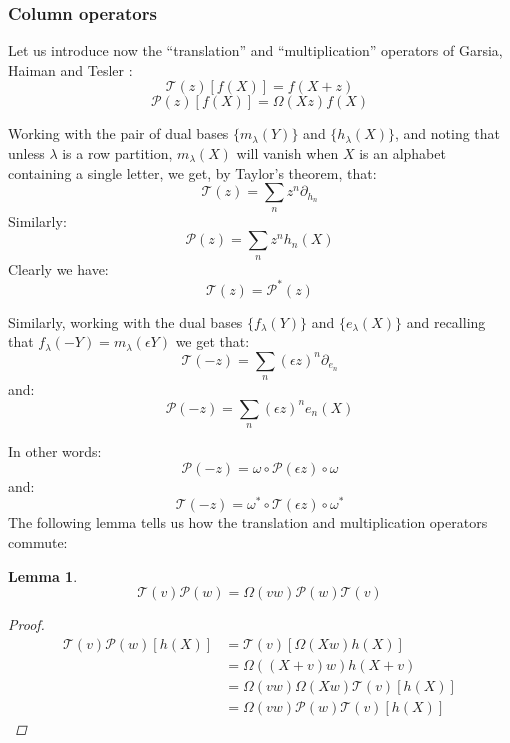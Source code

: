 \documentclass[12pt,dvips]{amsart}
\newtheorem{lemma}{Lemma}[section]
\begin{document}
\subsubsection{Column operators}
Let us introduce now the ``translation'' and ``multiplication'' operators of Garsia, Haiman and Tesler \cite{GARSIA2, GARSIA1}:
\begin{equation} \label{trans}
\mathcal{T}(z)[ f(X) ] = f \left( X + z \right ) 
\end{equation}
\begin{equation} \label{mult}
\mathcal{P}(z)[ f(X) ] = \Omega(Xz)f(X) 
\end{equation}

\par\bigskip

Working with the pair of dual bases $\{m_\lambda(Y)\}$ and $\{h_\lambda(X)\}$, and noting that unless $\lambda$ is a row partition, $m_\lambda(X)$ will vanish when $X$ is an alphabet containing a single letter, we get, by Taylor's theorem, that:
$$ \mathcal{T}(z) = \sum_n z^n \partial_{h_n} $$
Similarly:
$$ \mathcal{P}(z) = \sum_n z^n h_n(X) $$
Clearly we have:
\begin{equation}
\mathcal{T}(z) = \mathcal{P}^*(z) 
\end{equation}

\par\bigskip

Similarly, working with the dual bases $\{f_\lambda(Y) \}$ and $\{e_\lambda(X)\}$ and recalling that $f_\lambda(-Y) = m_\lambda(\epsilon Y) $ we get that:
$$ \mathcal{T}(-z) = \sum_n (\epsilon z)^n \partial_{e_n} $$
and:
$$ \mathcal{P}(-z) = \sum_n (\epsilon z)^n e_n(X) $$

\par\bigskip
In other words:
$$ \mathcal{P}(-z) = \omega \circ \mathcal{P}(\epsilon z) \circ \omega $$
and:
$$ \mathcal{T}(-z) = \omega^* \circ \mathcal{T}(\epsilon z) \circ \omega^* $$
The following lemma tells us how the translation and multiplication operators commute:
\begin{lemma} \label{commute}
$$ \mathcal{T}(v) \mathcal{P}(w) = \Omega(vw) \mathcal{P}(w) \mathcal{T}(v) $$
\begin{proof}
\begin{align*}
\mathcal{T}(v)\mathcal{P}(w)[h(X)] & =  \mathcal{T}(v)[ \Omega(Xw) h(X) ] \\
& =  \Omega((X+v)w) h(X + v) \\
& =  \Omega(vw) \Omega(Xw) \mathcal{T}(v) [h(X)] \\
& =  \Omega(vw) \mathcal{P}(w) \mathcal{T}(v)[h(X)]
\end{align*}
\qedhere
\end{proof}
\end{lemma}
\end{document}
